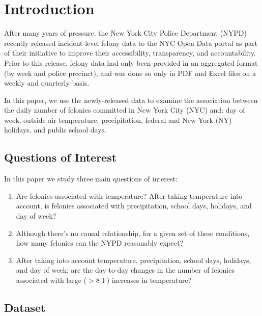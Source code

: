 \documentclass[11pt,notitlepage]{article}
\newcommand{\degf}{^\circ\text{F}}
\begin{document}
\pagebreak

\singlespacing



\section{Introduction}



After many years of pressure, the New York City Police Department (NYPD) recently released incident-level felony data to the NYC Open Data portal as part of their initiative to improve their accessibility, transparency, and accountability. Prior to this release, felony data had only been provided in an aggregated format (by week and police precinct), and was done so only in PDF and Excel files on a weekly and quarterly basis.

In this paper, we use the newly-released data to examine the association between the daily number of felonies committed in New York City (NYC) and: day of week, outside air temperature, precipitation, federal and New York (NY) holidays, and public school days.

\subsection{Questions of Interest}

In this paper we study three main questions of interest:

\begin{enumerate}
\setlength\itemsep{-1pt}
\item Are felonies associated with temperature? After taking temperature into account, is felonies associated with precipitation, school days, holidays, and day of week?
\item Although there's no causal relationship, for a given set of these conditions, how many felonies can the NYPD reasonably expect?
\item After taking into account temperature, precipitation, school days, holidays, and day of week; are the day-to-day changes in the number of felonies associated with large ($>8 \degf$) increases in temperature?
\end{enumerate}



\subsection{Dataset}
\label{sec:dataset}
\end{document}
